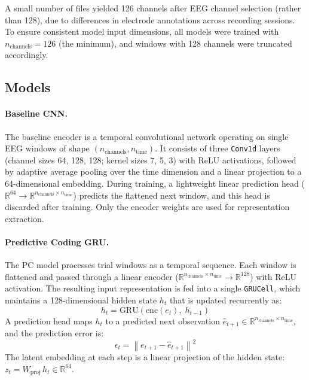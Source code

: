 \documentclass[11pt, letterpaper]{article}
\begin{document}
A small number of files yielded 126 channels after EEG channel selection (rather than
128), due to differences in electrode annotations across recording sessions. To ensure
consistent model input dimensions, all models were trained with $n_{\text{channels}} =
126$ (the minimum), and windows with 128 channels were truncated accordingly.

\subsection{Models}

\paragraph{Baseline CNN.}
The baseline encoder is a temporal convolutional network operating on single EEG windows
of shape $(n_{\text{channels}}, n_{\text{time}})$. It consists of three
\texttt{Conv1d} layers (channel sizes 64, 128, 128; kernel sizes 7, 5, 3) with ReLU
activations, followed by adaptive average pooling over the time dimension and a linear
projection to a 64-dimensional embedding. During training, a lightweight linear
prediction head ($\mathbb{R}^{64} \to \mathbb{R}^{n_{\text{channels}} \times
n_{\text{time}}}$) predicts the flattened next window, and this head is discarded after
training. Only the encoder weights are used for representation extraction.

\paragraph{Predictive Coding GRU.}
The PC model processes trial windows as a temporal sequence. Each window is flattened
and passed through a linear encoder ($\mathbb{R}^{n_{\text{channels}} \times
n_{\text{time}}} \to \mathbb{R}^{128}$) with ReLU activation. The resulting input
representation is fed into a single \texttt{GRUCell}, which maintains a 128-dimensional
hidden state $h_t$ that is updated recurrently as:
\begin{equation}
  h_t = \text{GRU}(\text{enc}(e_t),\; h_{t-1})
\end{equation}
A prediction head maps $h_t$ to a predicted next observation $\hat{e}_{t+1} \in
\mathbb{R}^{n_{\text{channels}} \times n_{\text{time}}}$, and the prediction error is:
\begin{equation}
  \epsilon_t = \left\| e_{t+1} - \hat{e}_{t+1} \right\|^2
\end{equation}
The latent embedding at each step is a linear projection of the hidden state:
$z_t = W_{\text{proj}}\, h_t \in \mathbb{R}^{64}$.
\end{document}
